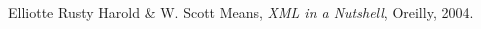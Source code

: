 \begin{thebibliography}{9}

  Elliotte Rusty Harold \& W. Scott Means,
  \textit{XML in a Nutshell},
  Oreilly,
  2004.
\end{thebibliography}
